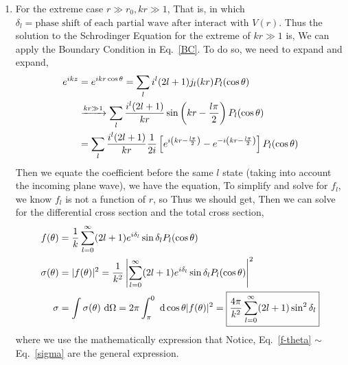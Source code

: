 \documentclass{school-22.101-notes}
\begin{document}
\begin{enumerate}
\item For the extreme case $r \gg r_0, kr \gg 1$, 
That is, 
in which $ \delta_l = \mbox{phase shift of each partial wave after interact with $V(r)$}.$ Thus the solution to the Schrodinger Equation for the extreme of $kr \gg 1$ is,
We can apply the Boundary Condition in Eq.~\ref{BC}. To do so, we need to expand 
and expand, 
\begin{align}
e^{ikz} &= e^{ikr \cos \theta} = \displaystyle\sum_l i^l (2l+1) j_l (kr) P_l (\cos \theta) \\
& \xrightarrow{kr \gg 1} \displaystyle\sum_l  \frac{i^l (2l+1)}{kr} \sin \left( kr - \frac{l \pi}{2} \right) P_l (\cos \theta) \\
&= \displaystyle\sum_l  \frac{i^l (2l+1)}{kr} \frac{1}{2i} \left[ e^{ i \left( kr - \frac{l \pi}{2} \right)} - e^{ -i \left( kr - \frac{l \pi}{2} \right)} \right] P_l (\cos \theta)
\end{align}
Then we equate the coefficient before the same $l$ state (taking into account the incoming plane wave), we have the equation, 
To simplify and solve for $f_l$, we know $f_l$ is not a function of $r$, so 
Thus we should get, 
Then we can solve for the differential cross section and the total cross section,
\begin{align}
f(\theta) &= \frac{1}{k} \displaystyle\sum_{l=0}^{\infty} (2l+1) e^{i \delta_l} \sin \delta_l P_l (\cos \theta) \label{f-theta} \\
\sigma (\theta) &= |f(\theta)|^2 = \frac{1}{k^2} \left| \displaystyle\sum_{l=0}^{\infty} (2l+1) e^{i \delta_l} \sin \delta_l P_l (\cos \theta) \right|^2 \label{sigma-theta} \\
\sigma &=  \int  \sigma(\theta) \mbox{ }\mathrm{d} \Omega = 2 \pi \int_{\pi}^0 \mbox{ }\mathrm{d} \cos \theta |f(\theta)|^2   = \boxed{\frac{4 \pi}{k^2} \displaystyle\sum_{l=0}^{\infty} (2l+1) \sin^2 \delta_l  \label{sigma} }
\end{align}
where we use the mathematically expression that 
Notice, Eq.~\ref{f-theta} $\sim$ Eq.~\ref{sigma} are the general expression. 
\end{enumerate}
\end{document}
